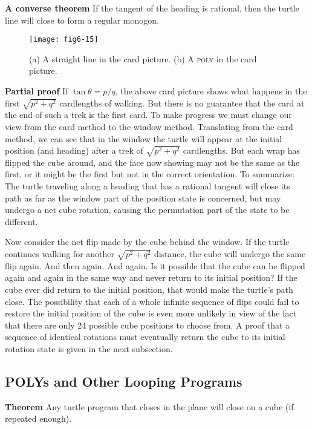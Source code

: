 \documentclass{book}
\begin{document}
\textbf{A converse theorem} If the tangent of the heading is rational, then the
turtle line will close to form a regular monogon.


\begin{figure}
\begin{center}
\texttt{[image: fig6-15]}
\caption{(a) A straight line in the card picture. (b) A \textsc{poly} in the card picture.}
\end{center}
\end{figure}

\textbf{Partial proof} If $\tan \theta = p / q$, the above card picture shows what happens
in the first $\sqrt{p^2 + q^2}$ cardlengths of walking. But there is no guarantee
that the card at the end of such a trek is the first card. To make progress
we must change our view from the card method to the window method.
Translating from the card method, we can see that in the window the
turtle will appear at the initial position (and heading) after a trek of
$\sqrt{p^2 + q^2}$ cardlengths. But each wrap has flipped the cube around, and
the face now showing may not be the same as the first, or it might be
the first but not in the correct orientation. To summarize: The turtle
traveling along a heading that has a rational tangent will close its path
as far as the window part of the position state is concerned, but may
undergo a net cube rotation, causing the permutation part of the state
to be different.

Now consider the net flip made by the cube behind the window. If
the turtle continues walking for another $\sqrt{p^2 + q^2}$ distance, the cube
will undergo the same flip again. And then again. And again. Is it
possible that the cube can be flipped again and again in the same way
and never return to its initial position? If the cube ever did return to the
initial position, that would make the turtle's path close. The possibility
that each of a whole infinite sequence of flips could fail to restore the
initial position of the cube is even more unlikely in view of the fact that
there are only 24 possible cube positions to choose from. A proof that
a sequence of identical rotations must eventually return the cube to its
initial rotation state is given in the next subsection.

\subsection{POLYs and Other Looping Programs}

\noindent \textbf{Theorem} Any turtle program that closes in the plane will close on a cube
(if repeated enough).
\end{document}
